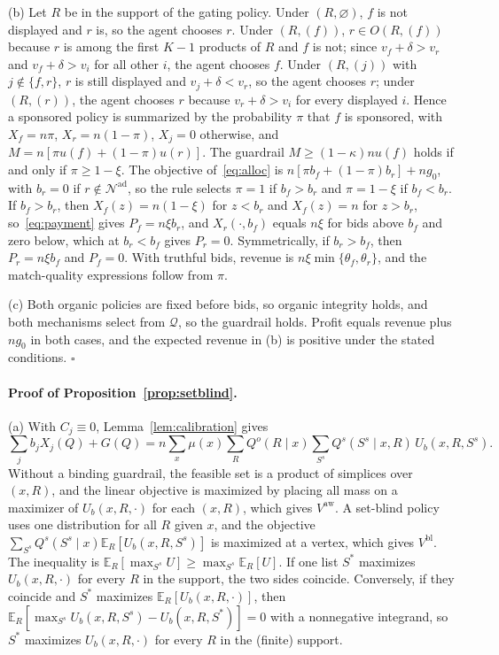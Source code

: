 \documentclass[opre,dblanonrev]{informs4}
\providecommand{\E}{\mathbb{E}}
\providecommand{\1}{\mathbf{1}}
\begin{document}
\begin{APPENDICES}
(b) Let $R$ be in the support of the gating policy. Under $(R,\varnothing)$, $f$ is not displayed and $r$ is, so the agent chooses $r$. Under $(R,(f))$, $r\in O(R,(f))$ because $r$ is among the first $K-1$ products of $R$ and $f$ is not; since $v_f+\delta>v_r$ and $v_f+\delta>v_i$ for all other $i$, the agent chooses $f$. Under $(R,(j))$ with $j\notin\{f,r\}$, $r$ is still displayed and $v_j+\delta<v_r$, so the agent chooses $r$; under $(R,(r))$, the agent chooses $r$ because $v_r+\delta>v_i$ for every displayed $i$. Hence a sponsored policy is summarized by the probability $\pi$ that $f$ is sponsored, with $X_f=n\pi$, $X_r=n(1-\pi)$, $X_j=0$ otherwise, and $M=n[\pi u(f)+(1-\pi)u(r)]$. The guardrail $M\ge(1-\kappa)nu(f)$ holds if and only if $\pi\ge1-\xi$. The objective of~\eqref{eq:alloc} is $n[\pi b_f+(1-\pi)b_r]+ng_0$, with $b_r=0$ if $r\notin\mathcal N^{\mathrm{ad}}$, so the rule selects $\pi=1$ if $b_f>b_r$ and $\pi=1-\xi$ if $b_f<b_r$. If $b_f>b_r$, then $X_f(z)=n(1-\xi)$ for $z<b_r$ and $X_f(z)=n$ for $z>b_r$, so~\eqref{eq:payment} gives $P_f=n\xi b_r$, and $X_r(\cdot,b_f)$ equals $n\xi$ for bids above $b_f$ and zero below, which at $b_r<b_f$ gives $P_r=0$. Symmetrically, if $b_r>b_f$, then $P_r=n\xi b_f$ and $P_f=0$. With truthful bids, revenue is $n\xi\min\{\theta_f,\theta_r\}$, and the match-quality expressions follow from $\pi$.

(c) Both organic policies are fixed before bids, so organic integrity holds, and both mechanisms select from $\mathcal Q$, so the guardrail holds. Profit equals revenue plus $ng_0$ in both cases, and the expected revenue in (b) is positive under the stated conditions. \hfill$\square$

\paragraph{Proof of Proposition~\ref{prop:setblind}.}
(a) With $C_j\equiv0$, Lemma~\ref{lem:calibration} gives
\[
\sum_jb_jX_j(Q)+G(Q)=n\sum_x\mu(x)\sum_RQ^o(R\mid x)\sum_{S^s}Q^s(S^s\mid x,R)\,U_b(x,R,S^s).
\] Without a binding guardrail, the feasible set is a product of simplices over $(x,R)$, and the linear objective is maximized by placing all mass on a maximizer of $U_b(x,R,\cdot)$ for each $(x,R)$, which gives $V^{\mathrm{aw}}$. A set-blind policy uses one distribution for all $R$ given $x$, and the objective $\sum_{S^s}Q^s(S^s\mid x)\E_R[U_b(x,R,S^s)]$ is maximized at a vertex, which gives $V^{\mathrm{bl}}$. The inequality is $\E_R[\max_{S^s}U]\ge\max_{S^s}\E_R[U]$. If one list $S^\ast$ maximizes $U_b(x,R,\cdot)$ for every $R$ in the support, the two sides coincide. Conversely, if they coincide and $S^\ast$ maximizes $\E_R[U_b(x,R,\cdot)]$, then $\E_R[\max_{S^s}U_b(x,R,S^s)-U_b(x,R,S^\ast)]=0$ with a nonnegative integrand, so $S^\ast$ maximizes $U_b(x,R,\cdot)$ for every $R$ in the (finite) support.


\end{APPENDICES}
\end{document}
